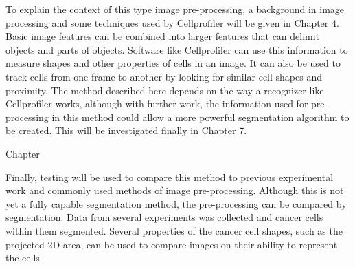 To explain the context of this type image pre-processing, a background in image processing and some techniques used by Cellprofiler will be given in Chapter 4. Basic image features can be combined into larger features that can delimit objects and parts of objects. Software like Cellprofiler can use this information to measure shapes and other properties of cells in an image. It can also be used to track cells from one frame to another by looking for similar cell shapes and proximity. The method described here depends on the way a recognizer like Cellprofiler works, although with further work, the information used for pre-processing in this method could allow a more powerful segmentation algorithm to be created. This will be investigated finally in Chapter 7.

Chapter

Finally, testing will be used to compare this method to previous experimental work and commonly used methods of image pre-processing. Although this is not yet a fully capable segmentation method, the pre-processing can be compared by segmentation. Data from several experiments was collected and cancer cells within them segmented. Several properties of the cancer cell shapes, such as the projected 2D area, can be used to compare images on their ability to represent the cells.
